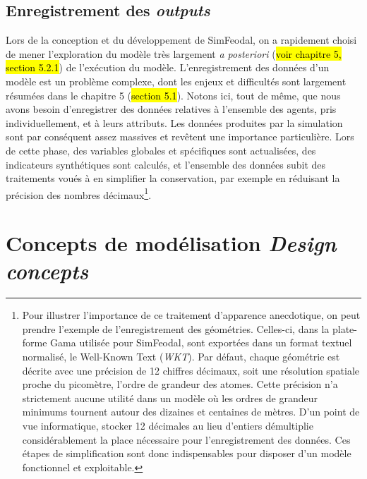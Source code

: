 \subsection{Enregistrement des \textit{outputs} \label{meca-outputs}}

Lors de la conception et du développement de SimFeodal, on a rapidement choisi de mener l'exploration du modèle très largement \textit{a posteriori} (\hl{voir chapitre 5, section 5.2.1}) de l'exécution du modèle.
L'enregistrement des données d'un modèle est un problème complexe, dont les enjeux et difficultés sont largement résumées dans le chapitre 5 (\hl{section 5.1}).
Notons ici, tout de même, que nous avons besoin d'enregistrer des données relatives à l'ensemble des agents, pris individuellement, et à leurs attributs.
Les données produites par la simulation sont par conséquent assez massives et revêtent une importance particulière.
Lors de cette phase, des variables globales et spécifiques sont actualisées, des indicateurs synthétiques sont calculés, et l'ensemble des données subit des traitements voués à en simplifier la conservation, par exemple en réduisant la précision des nombres décimaux\footnote{
Pour illustrer l'importance de ce traitement d'apparence anecdotique, on peut prendre l'exemple de l'enregistrement des géométries.
Celles-ci, dans la plate-forme Gama \autocite{taillandier_building_2018} utilisée pour SimFeodal, sont exportées dans un format textuel normalisé, le \og Well-Known Text\fg{} (\textit{WKT}).
Par défaut, chaque géométrie est décrite avec une précision de 12 chiffres décimaux, soit une résolution spatiale proche du picomètre, l'ordre de grandeur des atomes.
Cette précision n'a strictement aucune utilité dans un modèle où les ordres de grandeur minimums tournent autour des dizaines et centaines de mètres.
D'un point de vue informatique, stocker 12 décimales au lieu d'entiers démultiplie considérablement la place nécessaire pour l'enregistrement des données.
Ces étapes de simplification sont donc indispensables pour disposer d'un modèle fonctionnel et exploitable.
}.



\let\orisectionmark\sectionmark
\renewcommand\sectionmark[1]{}%
\section[Concepts de modélisation-- \textit{Design concepts}]{Concepts de modélisation \protect\newline \large{\textit{Design concepts}}}
\orisectionmark{Concepts de modélisation}
\let\sectionmark\orisectionmark

